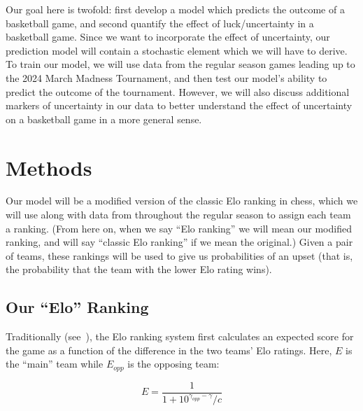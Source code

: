 \documentclass{article}
\begin{document}
Our goal here is twofold: first develop a model which predicts the outcome of a basketball game, and second quantify the effect of luck/uncertainty in a basketball game. Since we want to incorporate the effect of uncertainty, our prediction model will contain a stochastic element which we will have to derive. To train our model, we will use data from the regular season games leading up to the 2024 March Madness Tournament, and then test our model's ability to predict the outcome of the tournament. However, we will also discuss additional markers of uncertainty in our data to better understand the effect of uncertainty on a basketball game in a more general sense. 


\section{Methods}

Our model will be a modified version of the classic Elo ranking in chess, which we will use along with data from throughout the regular season to assign each team a ranking. (From here on, when we say ``Elo ranking'' we will mean our modified ranking, and will say ``classic Elo ranking'' if we mean the original.) Given a pair of teams, these rankings will be used to give us probabilities of an upset (that is, the probability that the team with the lower Elo rating wins). 


\subsection{Our ``Elo'' Ranking}
Traditionally (see~\cite{mediumRatingSystem}), the Elo ranking system first calculates an expected score for the game as a function of the difference in the two teams' Elo ratings. Here, $E$ is the ``main'' team while $E_{opp}$ is the opposing team:

\begin{equation}\label{eq:E}
E = \frac{1}{1+10^{\gamma_{opp}-\gamma}/c}
\end{equation}
\end{document}

